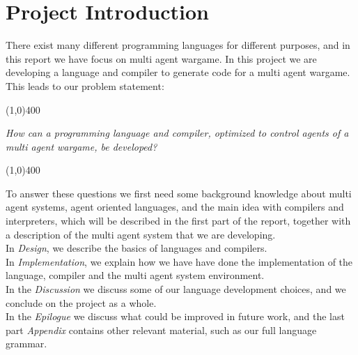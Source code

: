 \chapter*{Project Introduction}

There exist many different programming languages for different purposes, and in this report we have focus on multi agent wargame. In this project we are developing a language and compiler to generate code for a multi agent wargame. This leads to our problem statement:
\begin{center}
\line(1,0){400}
\end{center}
	\textit{How can a programming language and compiler, optimized to control agents of a multi agent wargame, be developed?}
\begin{center}
\line(1,0){400}
\end{center}
To answer these questions we first need some background knowledge about multi agent systems, agent oriented languages, and the main idea with compilers and interpreters, which will be described in the first part of the report, together with a description of the multi agent system that we are developing.\\ \indent
In \textit{Design}, we describe the basics of languages and compilers.\\ \indent
In \textit{Implementation}, we explain how we have have done the implementation of the language, compiler and the multi agent system environment.\\ \indent
In the \textit{Discussion} we discuss some of our language development choices, and we conclude on the project as a whole.\\ \indent
In the \textit{Epilogue} we discuss what could be improved in future work, and the last part \textit{Appendix} contains other relevant material, such as our full language grammar.